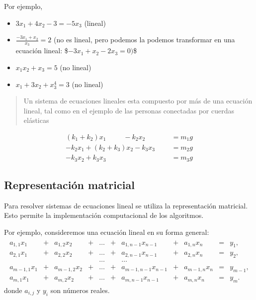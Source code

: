 \documentclass[letterpaper,10pt,english]{jupyterBook}
\begin{document}
\sphinxAtStartPar
Por ejemplo,
\begin{itemize}
\item {} 
\sphinxAtStartPar
\(3x_1 + 4x_2 - 3 = -5x_3\) (lineal)

\item {} 
\sphinxAtStartPar
\(\frac{-3x_1 + x_2}{x_3} = 2\) (no es lineal,  pero podemos la podemos transformar en una ecuación lineal: \$\( -3x_1 + x_2 -2x_3 = 0 )\)\$

\item {} 
\sphinxAtStartPar
\(x_1 x_2 + x_3 = 5\) (no lineal)

\item {} 
\sphinxAtStartPar
\(x_1 + 3x_2 + x_3^4 = 3\) (no lineal)

\end{itemize}
\begin{quote}

\sphinxAtStartPar
Un sistema de ecuaciones lineales esta compuesto por más de una ecuación lineal, tal como en el ejemplo de las personas conectadas por cuerdas elásticas
\end{quote}
\begin{align*}
(k_1 + k_2)x_1\;\;\;\;\;\;\;\;\; - k_2x_2 \;\;\;\;\;\;\;\;\;\;\,&=  m_1g\\
- k_2x_1 + (k_2 + k_3)x_2 - k_3x_3  &= m_2g\\
- k_3x_2 + k_3x_3 &= m_3g
\end{align*}

\subsection{Representación matricial}
\label{\detokenize{1.2-Algebra_lineal/1.2-Algebra_lineal:representacion-matricial}}
\sphinxAtStartPar
Para resolver sistemas de ecuaciones lineal se utiliza la representación matricial. Esto permite la implementación computacional de los algoritmos.

\sphinxAtStartPar
Por ejemplo, consideremos una ecuación lineal en su forma general:
\begin{eqnarray*}
\begin{array}{rcrcccccrcc}
a_{1,1} x_1 &+& a_{1,2} x_2 &+& {\ldots}& +& a_{1,n-1} x_{n-1} &+&a_{1,n} x_n &=& y_1,\\
a_{2,1} x_1 &+& a_{2,2} x_2 &+&{\ldots}& +& a_{2,n-1} x_{n-1} &+& a_{2,n} x_n &=& y_2, \\
&&&&{\ldots} &&{\ldots}&&&& \\
a_{m-1,1}x_1 &+& a_{m-1,2}x_2&+ &{\ldots}& +& a_{m-1,n-1} x_{n-1} &+& a_{m-1,n} x_n &=& y_{m-1},\\
a_{m,1} x_1 &+& a_{m,2}x_2 &+ &{\ldots}& +& a_{m,n-1} x_{n-1} &+& a_{m,n} x_n &=& y_{m}.
\end{array}
\end{eqnarray*}
\sphinxAtStartPar
donde \(a_{i,j}\) y \(y_i\) son números reales.
\end{document}
